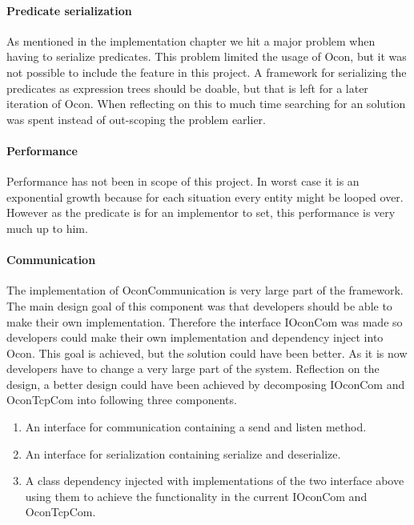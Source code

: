 \documentclass[../report.tex]{subfiles}
\begin{document}
\graphicspath{{img/}{../img/}}


\paragraph{Predicate serialization}
As mentioned in the implementation chapter we hit a major problem when having to serialize predicates. This problem limited the usage of Ocon, but it was not possible to include the feature in this project. A framework for serializing the predicates as expression trees should be doable, but that is left for a later iteration of Ocon. When reflecting on this to much time searching for an solution was spent instead of out-scoping the problem earlier. 

\paragraph{Performance}
Performance has not been in scope of this project. In worst case it is an exponential growth because for each situation every entity might be looped over. However as the predicate is for an implementor to set, this performance is very much up to him.


\paragraph{Communication}
The implementation of OconCommunication is very large part of the framework. The main design goal of this component was that developers should be able to make their own implementation. Therefore the interface IOconCom was made so developers could make their own implementation and dependency inject into Ocon. This goal is achieved, but the solution could have been better. As it is now developers have to change a very large part of the system. Reflection on the design, a better design could have been achieved by decomposing IOconCom and OconTcpCom into following three components.

\begin{enumerate}
\item An interface for communication containing a send and listen method.
\item An interface for serialization containing serialize and deserialize.
\item A class dependency injected with implementations of the two interface above using them to achieve the functionality in the current IOconCom and OconTcpCom.
\end{enumerate}
\end{document}
